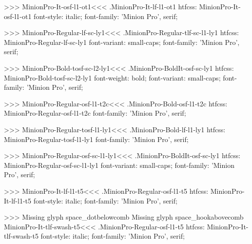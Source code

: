 {>>>
\<MinionPro-It-osf-l1-ot1\><<<
.MinionPro-It-lf-l1-ot1
htfcss:  MinionPro-It-osf-l1-ot1  font-style: italic; font-family: 'Minion Pro', serif;

>>>
\<MinionPro-Regular-lf-sc-ly1\><<<
.MinionPro-Regular-tlf-sc-l1-ly1
htfcss:  MinionPro-Regular-lf-sc-ly1  font-variant: small-caps; font-family: 'Minion Pro', serif;

>>>
\<MinionPro-Bold-tosf-sc-l2-ly1\><<<
.MinionPro-BoldIt-osf-sc-ly1
htfcss:  MinionPro-Bold-tosf-sc-l2-ly1  font-weight: bold; font-variant: small-caps; font-family: 'Minion Pro', serif;

>>>
\<MinionPro-Regular-osf-l1-t2c\><<<
.MinionPro-Bold-osf-l1-t2c
htfcss:  MinionPro-Regular-osf-l1-t2c  font-family: 'Minion Pro', serif;

>>>
\<MinionPro-Regular-tosf-l1-ly1\><<<
.MinionPro-Bold-lf-l1-ly1
htfcss:  MinionPro-Regular-tosf-l1-ly1  font-family: 'Minion Pro', serif;

>>>
\<MinionPro-Regular-osf-sc-l1-ly1\><<<
.MinionPro-BoldIt-osf-sc-ly1
htfcss:  MinionPro-Regular-osf-sc-l1-ly1  font-variant: small-caps; font-family: 'Minion Pro', serif;

>>>
\<MinionPro-It-lf-l1-t5\><<<
.MinionPro-Regular-osf-l1-t5
htfcss:  MinionPro-It-lf-l1-t5  font-style: italic; font-family: 'Minion Pro', serif;

>>>
Missing glyph	space_dotbelowcomb
Missing glyph	space_hookabovecomb
\<MinionPro-It-tlf-swash-t5\><<<
.MinionPro-Regular-osf-l1-t5
htfcss:  MinionPro-It-tlf-swash-t5  font-style: italic; font-family: 'Minion Pro', serif;

}
